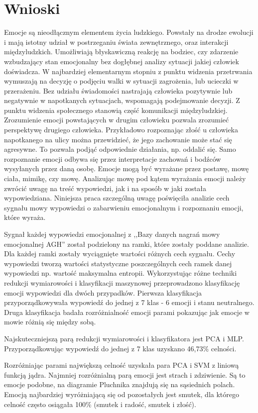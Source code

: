 \documentclass[a4paper,12pt,twoside,openany]{report}
\begin{document}
\chapter{Wnioski}
Emocje są nieodłącznym elementem życia ludzkiego. 
Powstały na drodze ewolucji i mają istotny udział w postrzeganiu świata zewnętrznego, oraz interakcji międzyludzkich.
Umożliwiają błyskawiczną reakcję na bodziec, czy zdarzenie wzbudzający stan emocjonalny bez dogłębnej analizy sytuacji jakiej człowiek doświadcza.
W najbardziej elementarnym stopniu z punktu widzenia przetrwania wymuszają na decyzję o podjęciu walki w sytuacji zagrożenia, lub ucieczki w przerażeniu.
Bez udziału świadomości nastrajają człowieka pozytywnie lub negatywnie w napotkanych sytuacjach, wspomagają podejmowanie decyzji.
Z punktu widzenia społecznego stanowią część komunikacji międzyludzkiej.
Zrozumienie emocji powstających w drugim człowieku pozwala zrozumieć perspektywę drugiego człowieka.
Przykładowo rozpoznając złość u człowieka napotkanego na ulicy można przewidzieć, że jego zachowanie może stać się agresywne.
To pozwala podjąć odpowiednie działania, np. oddalić się.
Samo rozpoznanie emocji odbywa się przez interpretacje zachowań i bodźców wysyłanych przez daną osobę.
Emocje mogą być wyrażane przez postawę, mowę ciała, mimikę, czy mowę.
Analizując mowę pod kątem wyrażania emocji należy zwrócić uwagę na treść wypowiedzi, jak i na sposób w jaki została wypowiedziana.
Niniejsza praca szczególną uwagę poświęciła analizie cech sygnału mowy wypowiedzi o zabarwieniu emocjonalnym i rozpoznaniu emocji, które wyraża.

Sygnał każdej wypowiedzi emocjonalnej z ,,Bazy danych nagrań mowy emocjonalnej AGH'' został podzielony na ramki, które zostały poddane analizie.
Dla każdej ramki zostały wyciągnięte wartości różnych cech sygnału. 
Cechy wypowiedzi tworzą wartości statystyczne poszczególnych cech ramek danej wypowiedzi np. wartość maksymalna entropii.
Wykorzystując różne techniki redukcji wymiarowości i klasyfikacji maszynowej przeprowadzono klasyfikację emocji wypowiedzi dla dwóch przypadków.
Pierwsza klasyfikacja przyporządkowywała wypowiedź do jednej z 7 klas - 6 emocji i stanu neutralnego.
Druga klasyfikacja badała rozróżnialność emocji parami pokazując jak emocje w mowie różnią się między sobą.

Najskuteczniejszą parą redukcji wymiarowości i klasyfikatora jest PCA i MLP. 
Przyporządkowując wypowiedź do jednej z 7 klas uzyskano 46,73\% celności.

Rozróżniając parami największą celność uzyskała para PCA i SVM z liniową funkcją jądra.
Najmniej rozróżnialną parą emocji jest strach i zdziwienie. 
Są to emocje podobne, na diagramie Pluchnika znajdują się na sąsiednich polach.
Emocją najbardziej wyróżniającą się od pozostałych jest smutek, 
dla którego celność często osiągała 100\% (smutek i radość, smutek i złość).

{}

\end{document}
